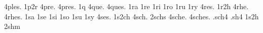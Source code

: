 {4ples.                                                                          
1p2r                                                                            
4pre.                                                                           
4pres.                                                                          
1q                                                                              
4que.                                                                           
4ques.                                                                          
1ra                                                                             
1re                                                                             
1ri                                                                             
1ro                                                                             
1ru                                                                             
1ry                                                                             
4res.                                                                           
1r2h                                                                            
4rhe.                                                                           
4rhes.                                                                          
1sa                                                                             
1se                                                                             
1si                                                                             
1so                                                                             
1su                                                                             
1sy                                                                             
4ses.                                                                           
1s2ch                                                                           
4sch.                                                                           
2schs                                                                           
4sche.                                                                          
4sches.                                                                         
.sch4                                                                           
.sh4                                                                            
1s2h                                                                            
2shm                                                                            
}
